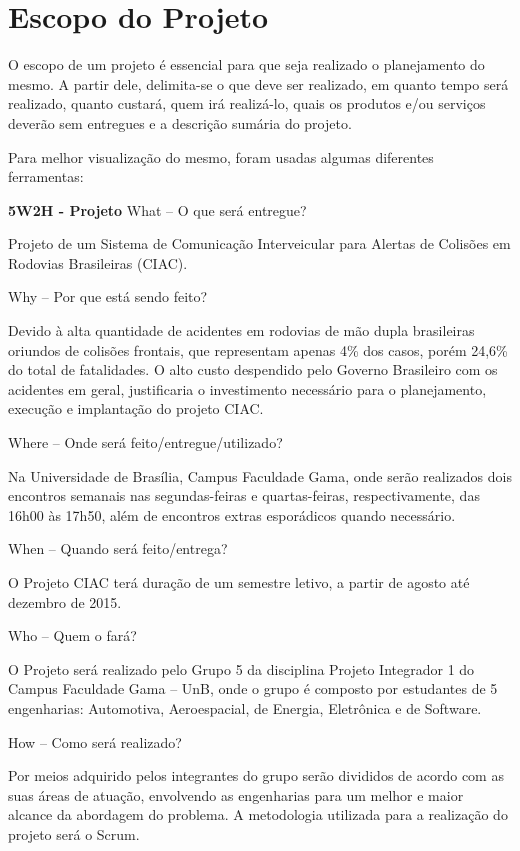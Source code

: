 \chapter{Escopo do Projeto }

O escopo de um projeto é essencial para que seja realizado o planejamento do mesmo. A partir dele, delimita-se o que deve ser realizado, em quanto tempo será realizado, quanto custará, quem irá realizá-lo, quais os produtos e/ou serviços deverão sem entregues e a descrição sumária do projeto.

Para melhor visualização do mesmo, foram usadas algumas diferentes ferramentas:

\textbf{5W2H - Projeto}
What – O que será entregue?

Projeto de um Sistema de Comunicação Interveicular para Alertas de Colisões em Rodovias Brasileiras (CIAC).

Why – Por que está sendo feito?

Devido à alta quantidade de acidentes em rodovias de mão dupla brasileiras oriundos de colisões frontais, que representam apenas 4\% dos casos, porém 24,6\% do total de fatalidades. O alto custo despendido pelo Governo Brasileiro com os acidentes em geral, justificaria o investimento necessário para o planejamento, execução e implantação do projeto CIAC.

Where – Onde será feito/entregue/utilizado?


Na Universidade de Brasília, Campus Faculdade Gama, onde serão realizados dois encontros semanais nas segundas-feiras e quartas-feiras, respectivamente, das 16h00 às 17h50, além de encontros extras esporádicos quando necessário.

When – Quando será feito/entrega?

O Projeto CIAC terá duração de um semestre letivo, a partir de agosto até dezembro de 2015.

Who – Quem o fará?

O Projeto será realizado pelo Grupo 5 da disciplina Projeto Integrador 1 do Campus Faculdade Gama – UnB, onde o grupo é composto por estudantes de 5 engenharias: Automotiva, Aeroespacial, de Energia, Eletrônica e de Software.


How – Como será realizado?

Por meios adquirido pelos integrantes do grupo serão divididos de acordo com as suas áreas de atuação, envolvendo as engenharias para um melhor e maior alcance da abordagem do problema. A metodologia utilizada para a realização do projeto será o Scrum.

